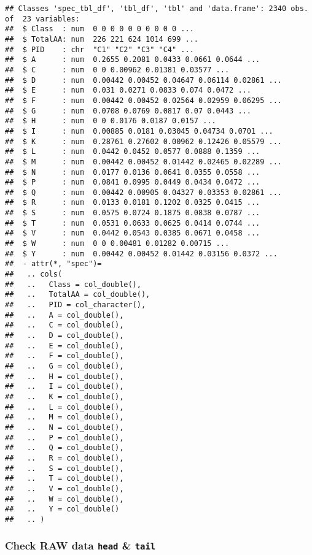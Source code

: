 \documentclass[]{article}
\begin{document}
\begin{verbatim}
## Classes 'spec_tbl_df', 'tbl_df', 'tbl' and 'data.frame': 2340 obs. of  23 variables:
##  $ Class  : num  0 0 0 0 0 0 0 0 0 0 ...
##  $ TotalAA: num  226 221 624 1014 699 ...
##  $ PID    : chr  "C1" "C2" "C3" "C4" ...
##  $ A      : num  0.2655 0.2081 0.0433 0.0661 0.0644 ...
##  $ C      : num  0 0 0.00962 0.01381 0.03577 ...
##  $ D      : num  0.00442 0.00452 0.04647 0.06114 0.02861 ...
##  $ E      : num  0.031 0.0271 0.0833 0.074 0.0472 ...
##  $ F      : num  0.00442 0.00452 0.02564 0.02959 0.06295 ...
##  $ G      : num  0.0708 0.0769 0.0817 0.07 0.0443 ...
##  $ H      : num  0 0 0.0176 0.0187 0.0157 ...
##  $ I      : num  0.00885 0.0181 0.03045 0.04734 0.0701 ...
##  $ K      : num  0.28761 0.27602 0.00962 0.12426 0.05579 ...
##  $ L      : num  0.0442 0.0452 0.0577 0.0888 0.1359 ...
##  $ M      : num  0.00442 0.00452 0.01442 0.02465 0.02289 ...
##  $ N      : num  0.0177 0.0136 0.0641 0.0355 0.0558 ...
##  $ P      : num  0.0841 0.0995 0.0449 0.0434 0.0472 ...
##  $ Q      : num  0.00442 0.00905 0.04327 0.03353 0.02861 ...
##  $ R      : num  0.0133 0.0181 0.1202 0.0325 0.0415 ...
##  $ S      : num  0.0575 0.0724 0.1875 0.0838 0.0787 ...
##  $ T      : num  0.0531 0.0633 0.0625 0.0414 0.0744 ...
##  $ V      : num  0.0442 0.0543 0.0385 0.0671 0.0458 ...
##  $ W      : num  0 0 0.00481 0.01282 0.00715 ...
##  $ Y      : num  0.00442 0.00452 0.01442 0.03156 0.0372 ...
##  - attr(*, "spec")=
##   .. cols(
##   ..   Class = col_double(),
##   ..   TotalAA = col_double(),
##   ..   PID = col_character(),
##   ..   A = col_double(),
##   ..   C = col_double(),
##   ..   D = col_double(),
##   ..   E = col_double(),
##   ..   F = col_double(),
##   ..   G = col_double(),
##   ..   H = col_double(),
##   ..   I = col_double(),
##   ..   K = col_double(),
##   ..   L = col_double(),
##   ..   M = col_double(),
##   ..   N = col_double(),
##   ..   P = col_double(),
##   ..   Q = col_double(),
##   ..   R = col_double(),
##   ..   S = col_double(),
##   ..   T = col_double(),
##   ..   V = col_double(),
##   ..   W = col_double(),
##   ..   Y = col_double()
##   .. )
\end{verbatim}

\newpage

\hypertarget{check-raw-data-head-tail}{%
\subsubsection{\texorpdfstring{Check RAW data \texttt{head} \&
\texttt{tail}}{Check RAW data head \& tail}}\label{check-raw-data-head-tail}}
\end{document}
